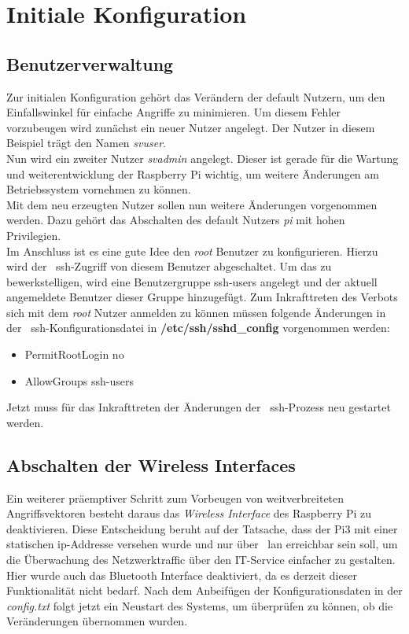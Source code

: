 
\section{Initiale Konfiguration}\label{sec:initiale-konfiguration}
\subsection{Benutzerverwaltung}\label{subsec: benutzerverwaltung}
Zur initialen Konfiguration gehört das Verändern der default Nutzern, um den Einfallswinkel für einfache Angriffe zu minimieren.
Um diesem Fehler vorzubeugen wird zunächst ein neuer Nutzer angelegt.
Der Nutzer in diesem Beispiel trägt den Namen \textit{svuser}. \\

Nun wird ein zweiter Nutzer \textit{svadmin} angelegt.
Dieser ist gerade für die Wartung und weiterentwicklung der Raspberry Pi wichtig, um weitere Änderungen am Betriebssystem vornehmen zu können. \\
\blankline
Mit dem neu erzeugten Nutzer sollen nun weitere Änderungen vorgenommen werden.
Dazu gehört das Abschalten des default Nutzers \textit{pi} mit hohen Privilegien. \\

\blankline
Im Anschluss ist es eine gute Idee den \textit{root} Benutzer zu konfigurieren.
Hierzu wird der ~\gls{ssh}-Zugriff von diesem Benutzer abgeschaltet.
Um das zu bewerkstelligen, wird eine Benutzergruppe ssh-users angelegt und der aktuell angemeldete Benutzer dieser Gruppe hinzugefügt.
Zum Inkrafttreten des Verbots sich mit dem \textit{root} Nutzer anmelden zu können müssen folgende Änderungen in der ~\gls{ssh}-Konfigurationsdatei in \textbf{/etc/ssh/sshd\_config} vorgenommen werden:
\begin{itemize}
    \item PermitRootLogin no
    \item AllowGroups ssh-users
\end{itemize}

Jetzt muss für das Inkrafttreten der Änderungen der ~\gls{ssh}-Prozess neu gestartet werden.


\subsection{Abschalten der Wireless Interfaces}\label{subsec:abschalten-des-wireless-interface}
Ein weiterer präemptiver Schritt zum Vorbeugen von weitverbreiteten Angriffsvektoren besteht daraus das \textit{Wireless Interface} des Raspberry Pi zu deaktivieren.
Diese Entscheidung beruht auf der Tatsache, dass der Pi3 mit einer statischen \gls{ip}-Addresse versehen wurde und nur über ~\gls{lan} erreichbar sein soll, um die Überwachung
des Netzwerktraffic über den IT-Service einfacher zu gestalten. \\

Hier wurde auch das Bluetooth Interface deaktiviert, da es derzeit dieser Funktionalität nicht bedarf.
Nach dem Anbeifügen der Konfigurationsdaten in der \textit{config.txt} folgt jetzt ein Neustart des Systems, um überprüfen zu können, ob die Veränderungen übernommen wurden.
